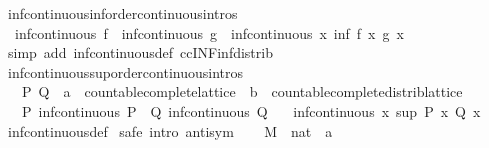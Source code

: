 \begin{isabellebody}
\endisatagproof
{\isafoldproof}%
%
\isadelimproof
\isanewline
%
\endisadelimproof
\isanewline
{}\isamarkupfalse%
\ inf{\isacharunderscore}continuous{\isacharunderscore}inf{\isacharbrackleft}order{\isacharunderscore}continuous{\isacharunderscore}intros{\isacharbrackright}{\isacharcolon}\isanewline
\ \ {\isachardoublequoteopen}inf{\isacharunderscore}continuous\ f\ {\isasymLongrightarrow}\ inf{\isacharunderscore}continuous\ g\ {\isasymLongrightarrow}\ inf{\isacharunderscore}continuous\ {\isacharparenleft}{\isasymlambda}x{\isachardot}\ inf\ {\isacharparenleft}f\ x{\isacharparenright}\ {\isacharparenleft}g\ x{\isacharparenright}{\isacharparenright}{\isachardoublequoteclose}\isanewline
%
\isadelimproof
\ \ %
\endisadelimproof
%
\isatagproof
{}\isamarkupfalse%
\ {\isacharparenleft}simp\ add{\isacharcolon}\ inf{\isacharunderscore}continuous{\isacharunderscore}def\ ccINF{\isacharunderscore}inf{\isacharunderscore}distrib{\isacharparenright}%
\endisatagproof
{\isafoldproof}%
%
\isadelimproof
\isanewline
%
\endisadelimproof
\isanewline
{}\isamarkupfalse%
\ inf{\isacharunderscore}continuous{\isacharunderscore}sup{\isacharbrackleft}order{\isacharunderscore}continuous{\isacharunderscore}intros{\isacharbrackright}{\isacharcolon}\isanewline
\ \ \ P\ Q\ {\isacharcolon}{\isacharcolon}\ {\isachardoublequoteopen}{\isacharprime}a\ {\isacharcolon}{\isacharcolon}\ countable{\isacharunderscore}complete{\isacharunderscore}lattice\ {\isasymRightarrow}\ {\isacharprime}b\ {\isacharcolon}{\isacharcolon}\ countable{\isacharunderscore}complete{\isacharunderscore}distrib{\isacharunderscore}lattice{\isachardoublequoteclose}\isanewline
\ \ \ P{\isacharcolon}\ {\isachardoublequoteopen}inf{\isacharunderscore}continuous\ P{\isachardoublequoteclose}\ \ Q{\isacharcolon}\ {\isachardoublequoteopen}inf{\isacharunderscore}continuous\ Q{\isachardoublequoteclose}\isanewline
\ \ \ {\isachardoublequoteopen}inf{\isacharunderscore}continuous\ {\isacharparenleft}{\isasymlambda}x{\isachardot}\ sup\ {\isacharparenleft}P\ x{\isacharparenright}\ {\isacharparenleft}Q\ x{\isacharparenright}{\isacharparenright}{\isachardoublequoteclose}\isanewline
%
\isadelimproof
\ \ %
\endisadelimproof
%
\isatagproof
{}\isamarkupfalse%
\ inf{\isacharunderscore}continuous{\isacharunderscore}def\isanewline
{}\isamarkupfalse%
\ {\isacharparenleft}safe\ intro{\isacharbang}{\isacharcolon}\ antisym{\isacharparenright}\isanewline
\ \ \isamarkupfalse%
\ M\ {\isacharcolon}{\isacharcolon}\ {\isachardoublequoteopen}nat\ {\isasymRightarrow}\ {\isacharprime}a{\isachardoublequoteclose}\ \isamarkupfalse%

\end{isabellebody}
